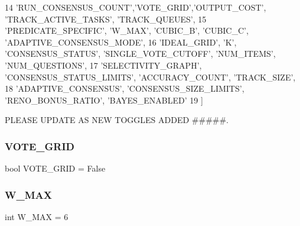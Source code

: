 \begin{DoxyCode}
14             \textcolor{stringliteral}{'RUN\_CONSENSUS\_COUNT'},\textcolor{stringliteral}{'VOTE\_GRID'},\textcolor{stringliteral}{'OUTPUT\_COST'}, \textcolor{stringliteral}{'TRACK\_ACTIVE\_TASKS'}, \textcolor{stringliteral}{'TRACK\_QUEUES'},
15             \textcolor{stringliteral}{'PREDICATE\_SPECIFIC'}, \textcolor{stringliteral}{'W\_MAX'}, \textcolor{stringliteral}{'CUBIC\_B'}, \textcolor{stringliteral}{'CUBIC\_C'}, \textcolor{stringliteral}{'ADAPTIVE\_CONSENSUS\_MODE'},
16             \textcolor{stringliteral}{'IDEAL\_GRID'}, \textcolor{stringliteral}{'K'}, \textcolor{stringliteral}{'CONSENSUS\_STATUS'}, \textcolor{stringliteral}{'SINGLE\_VOTE\_CUTOFF'}, \textcolor{stringliteral}{'NUM\_ITEMS'}, \textcolor{stringliteral}{'NUM\_QUESTIONS'},
17             \textcolor{stringliteral}{'SELECTIVITY\_GRAPH'}, \textcolor{stringliteral}{'CONSENSUS\_STATUS\_LIMITS'}, \textcolor{stringliteral}{'ACCURACY\_COUNT'}, \textcolor{stringliteral}{'TRACK\_SIZE'},
18             \textcolor{stringliteral}{'ADAPTIVE\_CONSENSUS'}, \textcolor{stringliteral}{'CONSENSUS\_SIZE\_LIMITS'}, \textcolor{stringliteral}{'RENO\_BONUS\_RATIO'}, \textcolor{stringliteral}{'BAYES\_ENABLED'}
19 ]
\end{DoxyCode}


P\+L\+E\+A\+SE U\+P\+D\+A\+TE AS N\+EW T\+O\+G\+G\+L\+ES A\+D\+D\+ED \#\#\#\#\#. 

\mbox{\label{namespacereorder_abd2acb6c03d6ca650537592475fc69e4}} 
\subsubsection{\texorpdfstring{V\+O\+T\+E\+\_\+\+G\+R\+ID}{VOTE\_GRID}}
{\footnotesize\ttfamily bool V\+O\+T\+E\+\_\+\+G\+R\+ID = False}

\mbox{\label{namespacereorder_add63171ca968cbd5ca4d60dfbf9a2746}} 
\subsubsection{\texorpdfstring{W\+\_\+\+M\+AX}{W\_MAX}}
{\footnotesize\ttfamily int W\+\_\+\+M\+AX = 6}

